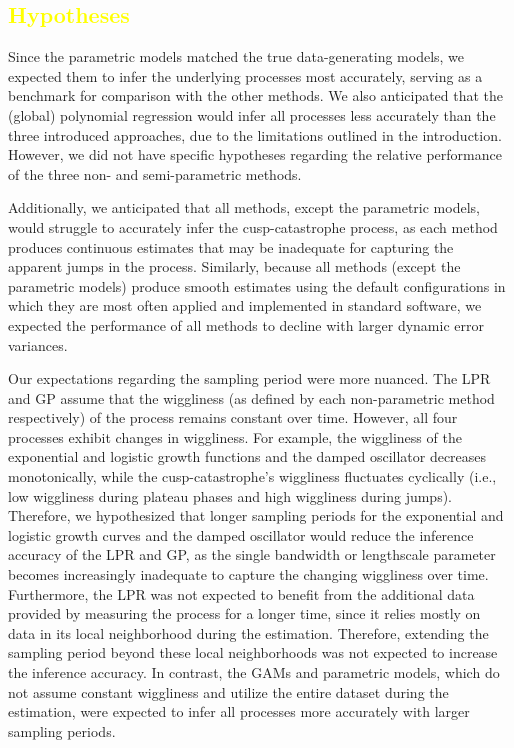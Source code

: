 \documentclass[man, floatsintext]{apa7}
\begin{document}
\subsection{\textcolor{yellow}{Hypotheses}}

Since the parametric models matched the true data-generating models, we
expected them to infer the underlying processes most accurately, serving as a
benchmark for comparison with the other methods. We also anticipated that the
(global) polynomial regression would infer all processes less accurately than
the three introduced approaches, due to the limitations outlined in the
introduction. However, we did not have specific hypotheses regarding the
relative performance of the three non- and semi-parametric methods.

Additionally, we anticipated that all methods, except the parametric models,
would struggle to accurately infer the cusp-catastrophe process, as each method
produces continuous estimates that may be inadequate for capturing the apparent
jumps in the process. Similarly, because all methods (except the parametric
models) produce smooth estimates using the default configurations in which they
are most often applied and implemented in standard software, we expected the
performance of all methods to decline with larger dynamic error variances.

Our expectations regarding the sampling period were more nuanced. The LPR and
GP assume that the wiggliness (as defined by each non-parametric method
respectively) of the process remains constant over time. However, all four
processes exhibit changes in wiggliness. For example, the wiggliness of the
exponential and logistic growth functions and the damped oscillator decreases
monotonically, while the cusp-catastrophe's wiggliness fluctuates cyclically
(i.e., low wiggliness during plateau phases and high wiggliness during jumps).
Therefore, we hypothesized that longer sampling periods for the exponential and
logistic growth curves and the damped oscillator would reduce the inference
accuracy of the LPR and GP, as the single bandwidth or lengthscale parameter
becomes increasingly inadequate to capture the changing wiggliness over time.
Furthermore, the LPR was not expected to benefit from the additional
data provided by measuring the process for a longer time, since it relies
mostly on data in its local neighborhood during the estimation. Therefore,
extending the sampling period beyond these local neighborhoods was not expected
to increase the inference accuracy. In contrast, the GAMs and parametric
models, which do not assume constant wiggliness and utilize the entire dataset
during the estimation, were expected to infer all processes more accurately
with larger sampling periods.
\end{document}
